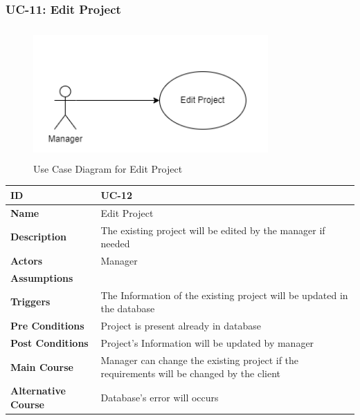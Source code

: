     \newpage

    \subsubsection{UC-11: Edit Project}
    \begin{figure}[H]
        \includegraphics[height=5cm, width=0.8\textwidth]{./diagrams/Use Case/u11.png}
        \centering 
        \caption{Use Case Diagram for Edit Project}
        \label{fig:Usecase1}
        \end{figure}
        
    \begin{center}
        \begin{tabularx}{\textwidth}{|l|X|}
            \hline
            \textbf{ID} & UC-12 \\
            \hline
            \textbf{Name} & Edit Project \\
            \hline
            \textbf{Description} & The existing project will be edited by the manager if needed  \\
            \hline
            \textbf{Actors} & Manager \\
            \hline
            \textbf{Assumptions} &  \\
            \hline
            \textbf{Triggers} & The Information of the existing project will be updated in the database \\
            \hline
            \textbf{Pre Conditions} & Project is present already in database \\
            \hline
            \textbf{Post Conditions} & Project's Information will be updated by manager \\
            \hline
            \textbf{Main Course} & Manager can change the existing project if the requirements will be changed by the client \\
            \hline
            \textbf{Alternative Course} & Database's error will occurs \\
            \hline
            
        \end{tabularx}
    \end{center}
    \newpage
    

